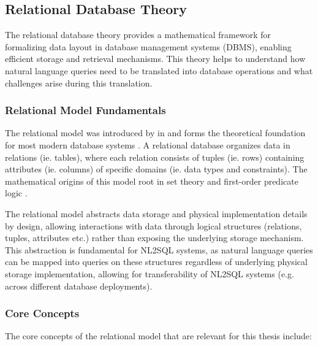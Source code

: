 \subsection{Relational Database Theory}

The relational database theory provides a mathematical framework for
formalizing data layout in database management systems (DBMS), enabling
efficient storage and retrieval mechanisms. This theory helps to understand how
natural language queries need to be translated into database operations and
what challenges arise during this translation.

\subsubsection{Relational Model Fundamentals}

The relational model was introduced by \citeauthor{RelationalModel} in
\citeyear{RelationalModel} and forms the theoretical foundation for most modern
database systems \citep{RelationalModel, Rendezvous}. A relational database
organizes data in relations (ie. tables), where each relation consists of
tuples (ie. rows) containing attributes (ie. columns) of specific domains (ie.
data types and constraints). The mathematical origins of this model root in set
theory and first-order predicate logic \citep{RelationalModel,
DatabaseSystemIntro}.

The relational model abstracts data storage and physical implementation details
by design, allowing interactions with data through logical structures
(relations, tuples, attributes etc.) rather than exposing the underlying
storage mechanism. This abstraction is fundamental for NL2SQL systems, as
natural language queries can be mapped into queries on these structures
regardless of underlying physical storage implementation, allowing for
transferability of NL2SQL systems (e.g. across different database deployments).

\subsubsection{Core Concepts}

The core concepts of the relational model that are relevant for this thesis
include:

